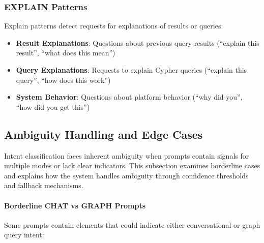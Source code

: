 \documentclass[a4paper,twoside]{sapthesis}
\begin{document}
\subsubsection{EXPLAIN Patterns}

Explain patterns detect requests for explanations of results or queries:

\begin{itemize}
    \item \textbf{Result Explanations}: Questions about previous query results (``explain this result'', ``what does this mean'')
    \item \textbf{Query Explanations}: Requests to explain Cypher queries (``explain this query'', ``how does this work'')
    \item \textbf{System Behavior}: Questions about platform behavior (``why did you'', ``how did you get this'')
\end{itemize}

\subsection{Ambiguity Handling and Edge Cases}

Intent classification faces inherent ambiguity when prompts contain signals for multiple modes or lack clear indicators. This subsection examines borderline cases and explains how the system handles ambiguity through confidence thresholds and fallback mechanisms.

\paragraph{Borderline CHAT vs GRAPH Prompts}

Some prompts contain elements that could indicate either conversational or graph query intent:
\end{document}
